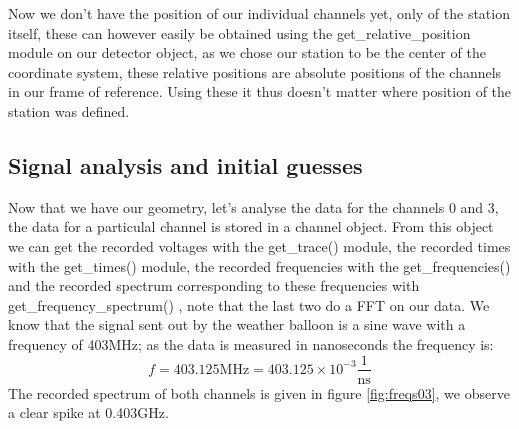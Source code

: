\documentclass[11pt,a4paper,faculty=we,language=en,doctype=report]{cls/ugent-doc}
\begin{document}
Now we don't have the position of our individual channels yet, only of the
station itself, these can however easily be obtained using the
get\_relative\_position module on our detector object, as we chose our station
to be the center of the coordinate system, these relative positions are
absolute positions of the channels in our frame of reference. Using
these it thus doesn't matter where position of the station was defined.

\subsection{Signal analysis and initial guesses}
Now that we have our geometry, let's analyse the data for the channels 0 and 3,
the data for a particulal channel is stored in a channel object. From this
object we can get the recorded voltages with the get\_trace() module, the
recorded times with the get\_times() module, the recorded frequencies with the
get\_frequencies() and the recorded spectrum corresponding to these frequencies
with get\_frequency\_spectrum() , note that the last two do a FFT on our data.
We know that the signal sent out by the weather balloon is a sine wave with a frequency of 403MHz; as the data is measured in nanoseconds the frequency is:
\begin{equation}
	f = 403.125\text{MHz} = 403.125\times 10^{-3} \frac{1}{\text{ns}}
\end{equation}
The recorded spectrum of both channels is given in figure \ref{fig:freqs03}, we
observe a clear spike at 0.403GHz.
\end{document}
